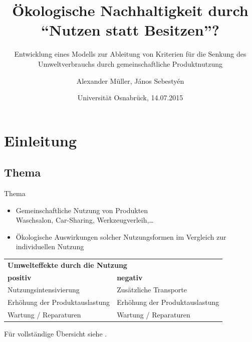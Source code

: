 \documentclass[beamer, xcolor={table,usenames,dvipsnames}]{beamer}
\title{Ökologische Nachhaltigkeit durch \\ \enquote{Nutzen statt Besitzen}?}
\subtitle{{\small Entwicklung eines Modells zur Ableitung von Kriterien für die Senkung des Umweltverbrauchs durch gemeinschaftliche Produktnutzung}}
\author{Alexander Müller, János Sebestyén}
\date{Universität Osnabrück, 14.07.2015}
\begin{document}
\frame[plain]{\titlepage}


\begin{frame}[plain]
    \begin{center}
    \end{center}
\end{frame}
\section{Einleitung}

\subsection{Thema}
	\begin{frame}{Thema}
        \begin{itemize}
            \item Gemeinschaftliche Nutzung von Produkten \\ Waschsalon,
                Car-Sharing, Werkzeugverleih,\dots
            \item Ökologische Auswirkungen solcher Nutzungsformen im Vergleich
                zur individuellen Nutzung
        \end{itemize}
        	\begin{center}
        		\small
        		\begin{tabular}{p{5cm}p{5cm}}
        			\multicolumn{2}{l}{\textbf{Umwelteffekte durch die
        					Nutzung}}  \\[5pt]
        			\textbf{positiv} & \textbf{negativ} \\
        			\midrule
        			Nutzungsintensivierung  &  Zusätzliche Transporte
        			\\[3pt]
        			Erhöhung der Produktauslastung  & Erhöhung der Produktauslastung \\[3pt]
        			Wartung / Reparaturen &  Wartung / Reparaturen \\[3pt]
        			\bottomrule
        		\end{tabular}
        		\vspace{3pt}

        		Für vollständige Übersicht siehe \cite{scholl_marketing_2009}.
        \end{center}
	\end{frame}
\end{document}
